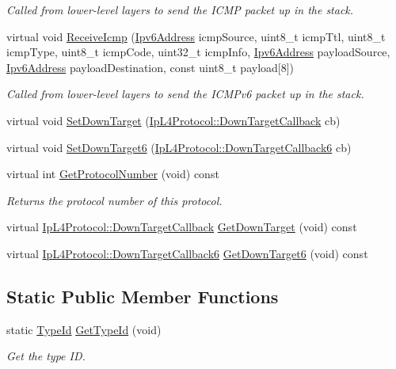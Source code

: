 \begin{DoxyCompactItemize}
\begin{DoxyCompactList}\small\item\em Called from lower-\/level layers to send the I\+C\+MP packet up in the stack. \end{DoxyCompactList}\item 
virtual void \hyperlink{classns3_1_1TcpL4Protocol_a8643c5c8926d6e21dfaabf472b5652d3}{Receive\+Icmp} (\hyperlink{classns3_1_1Ipv6Address}{Ipv6\+Address} icmp\+Source, uint8\+\_\+t icmp\+Ttl, uint8\+\_\+t icmp\+Type, uint8\+\_\+t icmp\+Code, uint32\+\_\+t icmp\+Info, \hyperlink{classns3_1_1Ipv6Address}{Ipv6\+Address} payload\+Source, \hyperlink{classns3_1_1Ipv6Address}{Ipv6\+Address} payload\+Destination, const uint8\+\_\+t payload\mbox{[}8\mbox{]})
\begin{DoxyCompactList}\small\item\em Called from lower-\/level layers to send the I\+C\+M\+Pv6 packet up in the stack. \end{DoxyCompactList}\item 
virtual void \hyperlink{classns3_1_1TcpL4Protocol_aa29220d10741bf33a6d95ce9a985971f}{Set\+Down\+Target} (\hyperlink{classns3_1_1IpL4Protocol_ae3ba76c0a48fbaa90529c528a15f12b6}{Ip\+L4\+Protocol\+::\+Down\+Target\+Callback} cb)
\item 
virtual void \hyperlink{classns3_1_1TcpL4Protocol_ae35e768fcbb81c201c695ba4fbbeab1d}{Set\+Down\+Target6} (\hyperlink{classns3_1_1IpL4Protocol_a039f3d1883632ab922fa958fc9ecd97f}{Ip\+L4\+Protocol\+::\+Down\+Target\+Callback6} cb)
\item 
virtual int \hyperlink{classns3_1_1TcpL4Protocol_aa92b0762011f084a4115e2802a90b651}{Get\+Protocol\+Number} (void) const 
\begin{DoxyCompactList}\small\item\em Returns the protocol number of this protocol. \end{DoxyCompactList}\item 
virtual \hyperlink{classns3_1_1IpL4Protocol_ae3ba76c0a48fbaa90529c528a15f12b6}{Ip\+L4\+Protocol\+::\+Down\+Target\+Callback} \hyperlink{classns3_1_1TcpL4Protocol_a609446282ae721c149d67d9015411def}{Get\+Down\+Target} (void) const 
\item 
virtual \hyperlink{classns3_1_1IpL4Protocol_a039f3d1883632ab922fa958fc9ecd97f}{Ip\+L4\+Protocol\+::\+Down\+Target\+Callback6} \hyperlink{classns3_1_1TcpL4Protocol_a5a196acbab733f671ab678e3d59d1a00}{Get\+Down\+Target6} (void) const 
\end{DoxyCompactItemize}
\subsection*{Static Public Member Functions}
\begin{DoxyCompactItemize}
\item 
static \hyperlink{classns3_1_1TypeId}{Type\+Id} \hyperlink{classns3_1_1TcpL4Protocol_ad5c8be6d4a2f790b4a095d97ad35f6f9}{Get\+Type\+Id} (void)
\begin{DoxyCompactList}\small\item\em Get the type ID. \end{DoxyCompactList}\end{DoxyCompactItemize}
